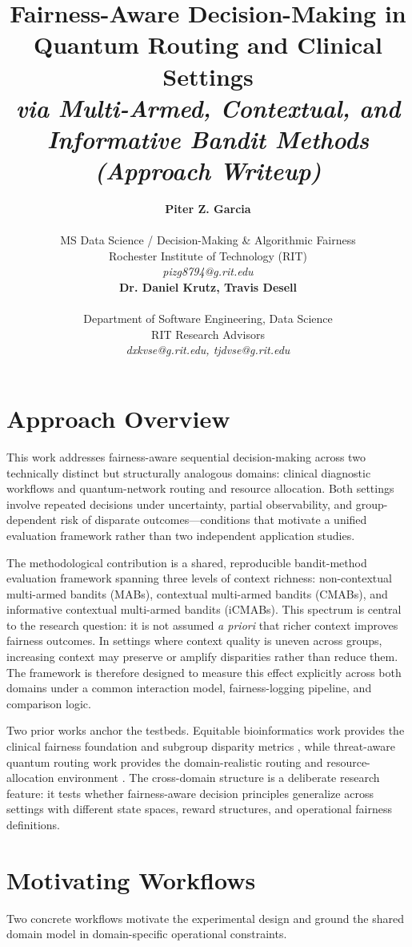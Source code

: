 \documentclass{IEEEtran}
\title{Fairness-Aware Decision-Making in Quantum Routing and Clinical Settings\\[0.3em]
{\large\textit{via Multi-Armed, Contextual, and Informative Bandit Methods}}\\[0.3em]
{\large\textit{(Approach Writeup)}}}
\author{%
\begin{minipage}{0.48\textwidth}
\begin{center}
{\bf Piter Z. Garcia}\\
\begin{small}
MS Data Science / Decision-Making \& Algorithmic Fairness\\
Rochester Institute of Technology (RIT)\\
{\it pizg8794@g.rit.edu}
\end{small}
\end{center}
\end{minipage}
\hfill
\begin{minipage}{0.48\textwidth}
\begin{center}
{\bf Dr. Daniel Krutz, Travis Desell}\\
\begin{small}
Department of Software Engineering, Data Science\\
RIT Research Advisors\\
{\it dxkvse@g.rit.edu, tjdvse@g.rit.edu}
\end{small}
\end{center}
\end{minipage}%
}
\begin{document}
\maketitle

\section{Approach Overview}
This work addresses fairness-aware sequential decision-making across two
technically distinct but structurally analogous domains: clinical diagnostic
workflows and quantum-network routing and resource allocation. Both settings
involve repeated decisions under uncertainty, partial observability, and
group-dependent risk of disparate outcomes---conditions that motivate a
unified evaluation framework rather than two independent application studies.

The methodological contribution is a shared, reproducible bandit-method
evaluation framework spanning three levels of context richness: non-contextual
multi-armed bandits (MABs), contextual multi-armed bandits (CMABs), and
informative contextual multi-armed bandits (iCMABs). This spectrum is central
to the research question: it is not assumed \textit{a priori} that richer
context improves fairness outcomes. In settings where context quality is
uneven across groups, increasing context may preserve or amplify disparities
rather than reduce them. The framework is therefore designed to measure this
effect explicitly across both domains under a common interaction model,
fairness-logging pipeline, and comparison logic.

Two prior works anchor the testbeds. Equitable bioinformatics work provides
the clinical fairness foundation and subgroup disparity metrics
\cite{garcia2025equitable_bioinformatics}, while threat-aware quantum
routing work provides the domain-realistic routing and resource-allocation
environment \cite{garcia2026threat_aware_quantum_routing}. The cross-domain
structure is a deliberate research feature: it tests whether fairness-aware
decision principles generalize across settings with different state spaces,
reward structures, and operational fairness definitions.

\section{Motivating Workflows}
Two concrete workflows motivate the experimental design and ground the shared
domain model in domain-specific operational constraints.
\end{document}
